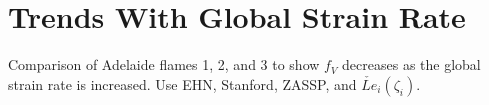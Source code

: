 \section{Trends With Global Strain Rate}
\label{sec:lesresults:strain}

Comparison of Adelaide flames 1, 2, and 3 to show $f_V$ decreases as the global strain rate is increased. Use EHN, Stanford, ZASSP, and $\check{Le}_i(\zeta_i)$.
